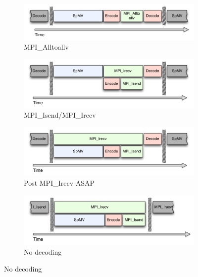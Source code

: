 \documentclass{report}
\begin{document}
\begin{figure} 
\centering
\begin{subfigure}{0.6\textwidth}
\centering
\includegraphics[width=\textwidth]{../figures/omnigraffle/AlltoallvCPU.pdf}
\caption{MPI\_Alltoallv}
\label{fig:alltoallv_cpu}
\end{subfigure}
\begin{subfigure}{0.6\textwidth}
\centering
\includegraphics[width=\textwidth]{../figures/omnigraffle/IsendIrecvCPU.pdf}
\caption{MPI\_Isend/MPI\_Irecv}
\label{fig:isendirecv_cpu}
\end{subfigure}
\begin{subfigure}{0.6\textwidth}
\centering
\includegraphics[width=\textwidth]{../figures/omnigraffle/IsendPreIrecvCPU.pdf}
\caption{Post MPI\_Irecv ASAP}
\label{fig:preirecv_cpu}
\end{subfigure}
\begin{subfigure}{0.6\textwidth}
\centering
\includegraphics[width=\textwidth]{../figures/omnigraffle/NoDecode.pdf}
\caption{No decoding}

\end{subfigure}
\end{figure}
\end{document}
